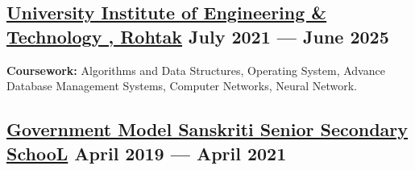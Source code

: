 
\subsection{{\href{https://mdu.ac.in/}{University Institute of Engineering \& Technology , Rohtak} \hfill July 2021 --- June 2025}}

\vspace{0.25em}
\subtext{}\textbf{Coursework:} Algorithms and Data Structures, Operating System, Advance Database Management Systems,
 Computer Networks, Neural Network.
\vspace{0.2em}
\begin{null}
\end{null}

\subsection{{\href{https://www.facebook.com/people/Govt-Model-Sanskriti-Senior-Secondary-School-Sec-55-Faridabad/100057441941889/}{Government Model Sanskriti Senior Secondary SchooL} \hfill April 2019 --- April 2021}}
\begin{null}

\end{null}